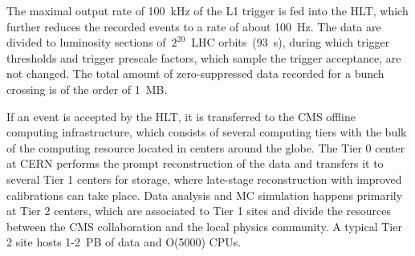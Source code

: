 The maximal output rate of 100~kHz of the L1 trigger is fed into the HLT, which further reduces the recorded events to a rate of about 100~Hz. The data are divided to luminosity sections of~$2^{20}$~LHC orbits~(93~s), during which trigger thresholds and trigger prescale factors, which sample the trigger acceptance, are not changed. The total amount of zero-suppressed data recorded for a bunch crossing is of the order of 1~MB.

If an event is accepted by the HLT, it is transferred to the CMS offline computing infrastructure, which consists of several computing tiers with the bulk of the computing resource located in centers around the globe. The Tier 0 center at CERN performs the prompt reconstruction of the data and transfers it to several Tier 1 centers for storage, where late-stage reconstruction with improved calibrations can take place. Data analysis and MC simulation happens primarily at Tier 2 centers, which are associated to Tier 1 sites and divide the resources between the CMS collaboration and the local physics community. A typical Tier 2 site hosts 1-2~PB of data and O(5000) CPUs.